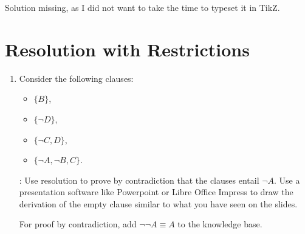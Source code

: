 \documentclass{acAssignment}
\begin{document}
\begin{acSolution}
    Solution missing, as I did not want to take the time to typeset it in TikZ.
\end{acSolution}

\section{Resolution with Restrictions}

\begin{enumerate}
    \item Consider the following clauses:
        
        \begin{itemize}
            \item $\{B\}$,
            \item $\{\lnot D\}$,
            \item $\{\lnot C, D\}$,
            \item $\{\lnot A, \lnot B, C\}$.
        \end{itemize}
        
        :
        Use resolution to prove by contradiction that the clauses entail $\lnot A$.
        Use a presentation software like Powerpoint or Libre Office Impress to draw the derivation of the empty clause similar to what you have seen on the slides.
        
        \begin{acSolution}
            For proof by contradiction, add $\lnot \lnot A \equiv A$ to the knowledge base.
            
            \begin{center}
            \end{center}
        \end{acSolution}
    

\end{enumerate}
\end{document}
